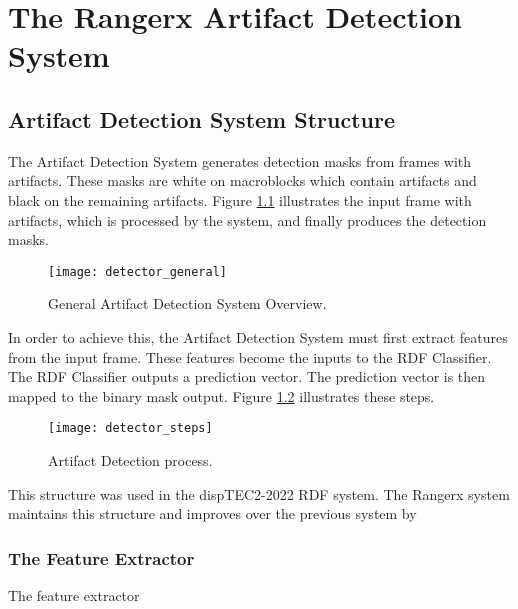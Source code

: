 \chapter{The Rangerx Artifact Detection System}
\label{ch:solucion}

\section{Artifact Detection System Structure}
\label{sec:sol_struct}

The Artifact Detection System generates detection masks from frames with artifacts. These masks are white on macroblocks which contain artifacts and black on the remaining artifacts. Figure \ref{fig:detector_overview} illustrates the input frame with artifacts, which is processed by the system, and finally produces the detection masks.

\begin{figure} [!h]
  \centering
  
  \texttt{[image: detector\_general]}
  
  \caption{General Artifact Detection System Overview. }
  \label{fig:detector_overview}

\end{figure}

In order to achieve this, the Artifact Detection System must first extract features from the input frame. These features become the inputs to the RDF Classifier. The RDF Classifier outputs a prediction vector. The prediction vector is then mapped to the binary mask output. Figure \ref{fig:detector_steps} illustrates these steps.

\begin{figure} [!h]
  \centering
  
  \texttt{[image: detector\_steps]}
  
  \caption{Artifact Detection process. }
  \label{fig:detector_steps}

\end{figure}

This structure was used in the dispTEC2-2022 RDF system. The Rangerx system maintains this structure and improves over the previous system by 

\subsection{The Feature Extractor}
\label{sec:sol_features}

The feature extractor

